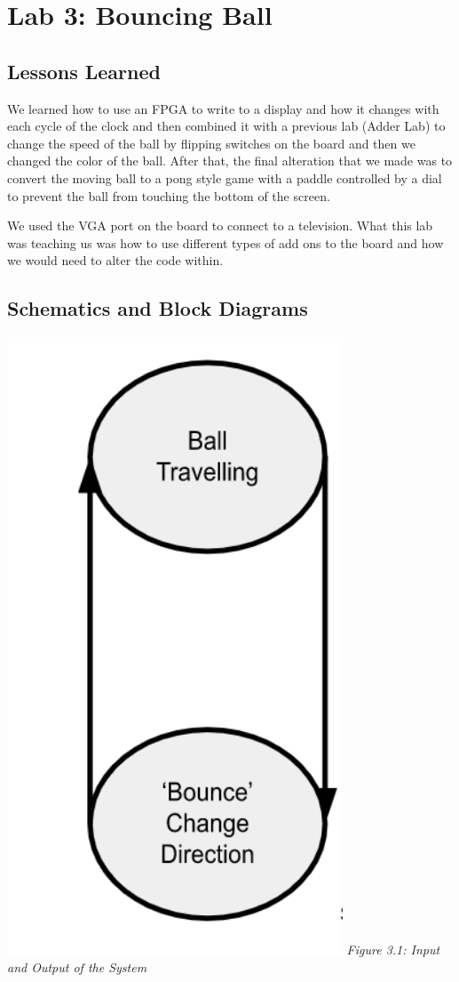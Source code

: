 \chapter{Lab 3: Bouncing Ball \\
\label{Introduction}}

\section{Lessons Learned \label{Section::Lessons Learned}}
    We learned how to use an FPGA to write to a display and how it changes with each cycle of the clock and then combined it with a previous lab (Adder Lab) to change the speed of the ball by flipping switches on the board and then we changed the color of the ball. After that, the final alteration that we made was to convert the moving ball to a pong style game with a paddle controlled by a dial to prevent the ball from touching the bottom of the screen. 

    We used the VGA port on the board to connect to a television. What this lab was teaching us was how to use different types of add ons to the board and how we would need to alter the code within. 
 \section{Schematics and Block Diagrams}
    \includegraphics[width=100mm]{lab3/Lab3t.png}
    \emph{Figure 3.1: Input and Output of the System}
    
